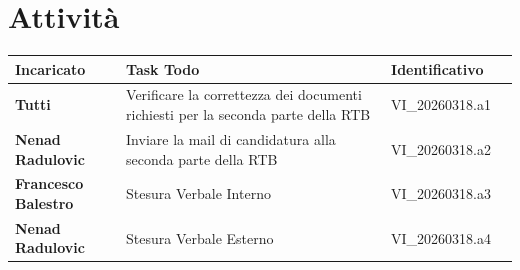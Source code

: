 \documentclass[a4paper,12pt]{article}
\begin{document}
    \section{Attività} {
        \begin{tabularx}{\textwidth}{|l|X|l|l|}
            \hline
            \textbf{Incaricato} & \textbf{Task Todo} & \textbf{Identificativo} \\
            \hline
            \textbf{Tutti} & Verificare la correttezza dei documenti richiesti per la seconda parte della RTB & VI\_20260318.a1 \\
            \hline
            \textbf{Nenad Radulovic} & Inviare la mail di candidatura alla seconda parte della RTB & VI\_20260318.a2 \\
            \hline
            \textbf{Francesco Balestro} & Stesura Verbale Interno & VI\_20260318.a3 \\
            \hline
            \textbf{Nenad Radulovic} & Stesura Verbale Esterno & VI\_20260318.a4 \\
            \hline
        \end{tabularx}
    }
\end{document}
